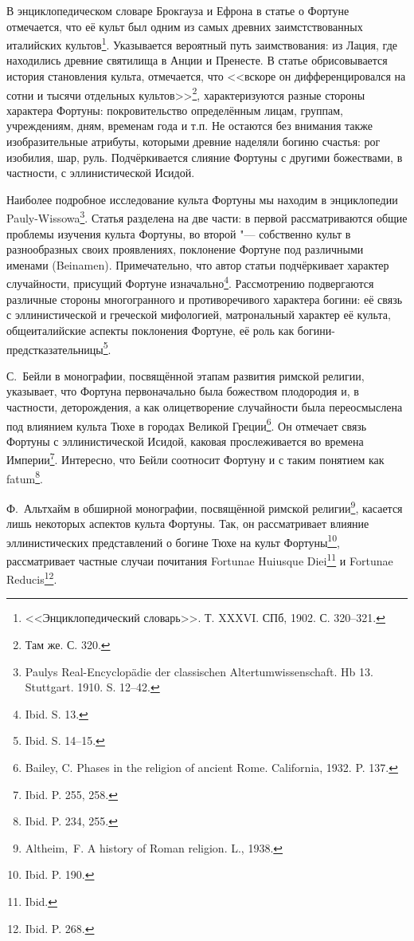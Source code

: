 В энциклопедическом словаре Брокгауза и Ефрона в статье о Фортуне отмечается, что её культ был одним из самых древних заимстствованных италийских культов\footnote{<<Энциклопедический словарь>>. Т. XXXVI. СПб, 1902. С. 320--321.}. Указывается вероятный путь заимствования: из Лация, где находились древние святилища в Анции и Пренесте. В статье обрисовывается история становления культа, отмечается, что <<вскоре он дифференцировался на сотни и тысячи отдельных культов>>\footnote{Там же. С. 320.}, характеризуются разные стороны характера Фортуны: покровительство определённым лицам, группам, учреждениям, дням, временам года и т.п. Не остаются без внимания также изобразительные атрибуты, которыми древние наделяли богиню счастья: рог изобилия, шар, руль. Подчёркивается слияние Фортуны с другими божествами, в частности, с эллинистической Исидой.

Наиболее подробное исследование культа Фортуны мы находим в энциклопедии Pauly-Wissowa\footnote{Paulys Real-Encyclop\"{a}die der classischen Altertumwissenschaft. Hb 13. Stuttgart. 1910. S. 12--42.}. Статья разделена на две части: в первой рассматриваются общие проблемы изучения культа Фортуны, во второй "--- собственно культ в разнообразных своих проявлениях, поклонение Фортуне под различными именами (Beinamen). Примечательно, что автор статьи подчёркивает характер случайности, присущий Фортуне изначально\footnote{Ibid. S. 13.}. Рассмотрению подвергаются различные стороны многогранного и противоречивого характера богини: её связь с эллинистической  и греческой мифологией, матрональный характер её культа, общеиталийские аспекты поклонения Фортуне, её роль как богини-предстказательницы\footnote{Ibid. S. 14--15.}.

С.~Бейли в монографии, посвящённой этапам развития римской религии, указывает, что Фортуна первоначально была божеством плодородия и, в частности, деторождения, а как олицетворение случайности была переосмыслена под влиянием культа Тюхе в городах Великой Греции\footnote{Bailey, C. Phases in the religion of ancient Rome. California, 1932. P. 137.}. Он отмечает связь Фортуны с эллинистической Исидой, каковая прослеживается во времена Империи\footnote{Ibid. P. 255, 258.}. Интересно, что Бейли соотносит Фортуну и  с таким понятием как fatum\footnote{Ibid. P. 234, 255.}.

Ф.~Альтхайм в обширной монографии, посвящённой римской религии\footnote{Altheim,~F. A history of Roman religion. L., 1938.}, касается лишь некоторых аспектов культа Фортуны. Так, он рассматривает влияние эллинистических представлений о богине Тюхе на культ Фортуны\footnote{Ibid. P. 190.}, рассматривает частные случаи почитания Fortunae Huiusque Diei\footnote{Ibid.} и Fortunae Reducis\footnote{Ibid. P. 268.}.

